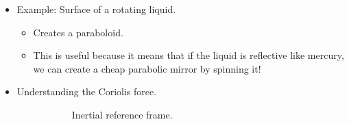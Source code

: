 \documentclass[../notes.tex]{subfiles}
\begin{document}
\begin{itemize}
    \item Example: Surface of a rotating liquid.
    \begin{itemize}
        \item Creates a paraboloid.
        \item This is useful because it means that if the liquid is reflective like mercury, we can create a cheap parabolic mirror by spinning it!
    \end{itemize}
    \item Understanding the Coriolis force.
    \begin{figure}[H]
        \centering
        \begin{subfigure}[b]{0.3\linewidth}
            \centering
            \caption{Inertial reference frame.}
            \label{fig:coriolisForcea}
        \end{subfigure}
        \begin{subfigure}[b]{0.3\linewidth}
            \centering
\end{subfigure}
\end{figure}
\end{itemize}
\end{document}
